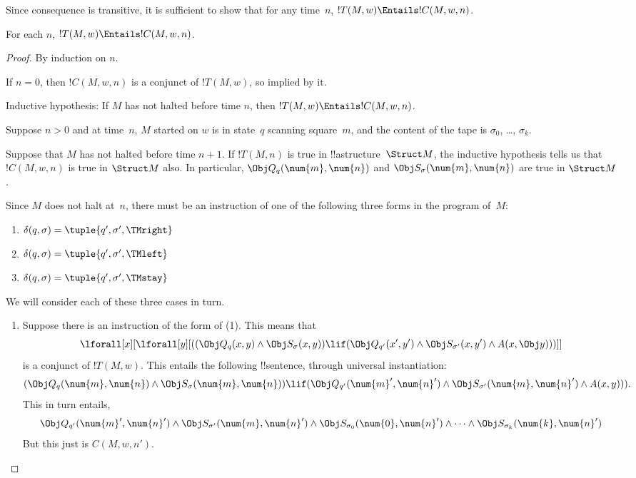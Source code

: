 \documentclass[../../../include/open-logic-section]{subfiles}
\begin{document}
Since consequence is transitive, it is sufficient to show that for any
time~$n$, $!T(M, w) \Entails !C(M, w, n)$.

\begin{lem} 
For each $n$, $!T(M, w) \Entails !C(M, w, n)$. 
\end{lem}

\begin{proof}
By induction on $n$.

If $n = 0$, then $!C(M, w, n)$ is a conjunct of $!T(M, w)$, so implied by it.

Inductive hypothesis: If $M$ has not halted before time $n$, then
$!T(M,w) \Entails !C(M, w, n)$.

Suppose $n > 0$ and at time~$n$, $M$ started on $w$ is in state~$q$
scanning square~$m$, and the content of the tape is $\sigma_0$, \dots,
$\sigma_k$.

Suppose that $M$ has not halted before time $n+1$. If $!T(M,n)$ is
true in !!a{structure}~$\Struct M$, the inductive hypothesis tells us
that $!C(M, w, n)$ is true in $\Struct M$ also. In particular, $\Obj
Q_q(\num{m}, \num{n})$ and $\Obj S_\sigma(\num{m}, \num{n})$ are true
in $\Struct M$.

Since $M$ does not halt at~$n$, there must be an instruction of one of the
following three forms in the program of~$M$: 

\begin{enumerate} 
\item $\delta(q, \sigma) = \tuple{q', \sigma', \TMright}$

\item $\delta(q, \sigma) = \tuple{q', \sigma', \TMleft}$

\item $\delta(q, \sigma) = \tuple{q', \sigma', \TMstay}$
\end{enumerate}

We will consider each of these three cases in turn.

\begin{enumerate} 
\item Suppose there is an instruction of the form of (1).
This means that 
\[ 
\lforall[x][\lforall[y][((\Obj Q_{q}(x,
y) \land \Obj S_\sigma(x, y)) \lif (\Obj Q_{q'}(x',
y') \land \Obj S_{\sigma'}(x, y') \land A(x, \Obj
y)))]]
\] 
is a conjunct of $!T(M,w)$. This entails the following
!!{sentence}, through universal instantiation: 
\[ 
(\Obj Q_{q}(\num{m}, \num{n}) \land \Obj S_{\sigma}(\num{m}, \num{n})) \lif (\Obj
Q_{q'}(\num{m}', \num{n}') \land \Obj S_{\sigma'}(\num{m}, \num{n}') \land A(x, y))).
\]
This in turn entails,
\[
\Obj Q_{q'}(\num{m}', \num{n}') \land \Obj S_{\sigma'}(\num{m},
\num{n}') \land \Obj S_{\sigma_0}(\num{0}, \num{n}') \land \dots \land \Obj
S_{\sigma_k}(\num{k}, \num{n}')
\] 
But this just is $C(M, w, n')$.


\end{enumerate}
\end{proof}
\end{document}
